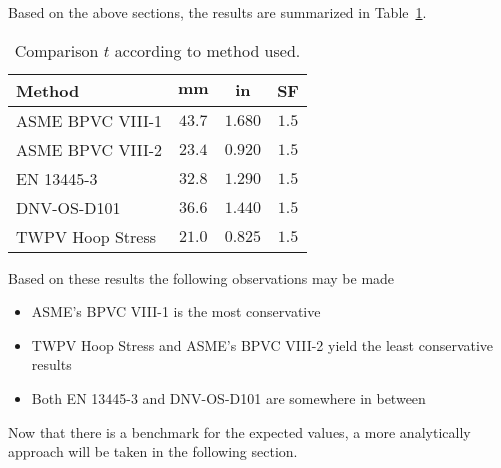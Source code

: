 Based on the above sections, the results are summarized in Table~\ref{table:2_comp}.
\begin{table}[H]
	\centering
	\caption{Comparison $t$ according to method used.}
	\begin{tabular}{lccc}
		\textbf{Method}  & \textbf{$\mathbf{mm}$} & \textbf{$\mathbf{in}$} & \textbf{SF} \\
		\midrule
		ASME BPVC VIII-1 & $43.7$                 & $1.680$                & $1.5$       \\
		ASME BPVC VIII-2 & $23.4$                 & $0.920$                & $1.5$       \\
		EN 13445-3       & $32.8$                 & $1.290$                & $1.5$       \\    
		DNV-OS-D101      & $36.6$                 & $1.440$                & $1.5$       \\
		TWPV Hoop Stress & $21.0$                 & $0.825$                & $1.5$       \\
	\end{tabular}%
	\label{table:2_comp}%
\end{table}%

Based on these results the following observations may be made

\begin{itemize}
	\item ASME's BPVC VIII-1 is the most conservative
	\item TWPV Hoop Stress and ASME's BPVC VIII-2 yield the least conservative results
	\item Both EN 13445-3  and DNV-OS-D101 are somewhere in between \\
\end{itemize}

Now that there is a benchmark for the expected values, a more analytically approach will be taken in the following section.